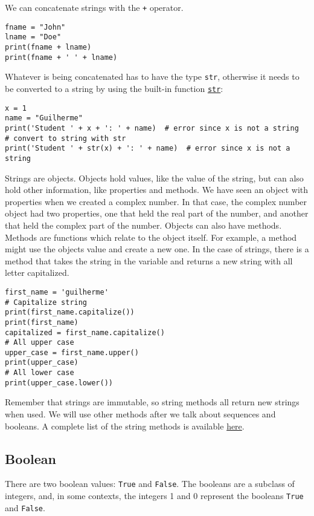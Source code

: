 \documentclass[12pt, a4paper]{article}
\begin{document}
We can concatenate strings with the \texttt{+} operator.
\lstset{language=jupyter-python,label= ,caption= ,captionpos=b,numbers=none}
\begin{lstlisting}
fname = "John"
lname = "Doe"
print(fname + lname)
print(fname + ' ' + lname)
\end{lstlisting}
Whatever is being concatenated has to have the type \texttt{str}, otherwise it needs to be converted to a string by using the built-in function \href{https://docs.python.org/3.6/library/functions.html?\#func-str}{\texttt{str}}:
\lstset{language=jupyter-python,label= ,caption= ,captionpos=b,numbers=none}
\begin{lstlisting}
x = 1
name = "Guilherme"
print('Student ' + x + ': ' + name)  # error since x is not a string
# convert to string with str
print('Student ' + str(x) + ': ' + name)  # error since x is not a string
\end{lstlisting}
Strings are objects.
Objects hold values, like the value of the string, but can also hold other information, like properties and methods.
We have seen an object with properties when we created a complex number.
In that case, the complex number object had two properties, one that held the real part of the number, and another that held the complex part of the number.
Objects can also have methods.
Methods are functions which relate to the object itself.
For example, a method might use the objects value and create a new one.
In the case of strings, there is a method that takes the string in the variable and returns a new string with all letter capitalized.
\lstset{language=jupyter-python,label= ,caption= ,captionpos=b,numbers=none}
\begin{lstlisting}
first_name = 'guilherme'
# Capitalize string
print(first_name.capitalize())
print(first_name)
capitalized = first_name.capitalize()
# All upper case
upper_case = first_name.upper()
print(upper_case)
# All lower case
print(upper_case.lower())
\end{lstlisting}
Remember that strings are immutable, so string methods all return new strings when used.
We will use other methods after we talk about sequences and booleans.
A complete list of the string methods is available \href{https://docs.python.org/3.6/library/stdtypes.html\#string-methods}{here}.
\subsection{Boolean}
\label{sec:org03406d5}
There are two boolean values: \texttt{True} and \texttt{False}.
The booleans are a subclass of integers, and, in some contexts, the integers 1 and 0 represent the booleans \texttt{True} and \texttt{False}.
\end{document}
